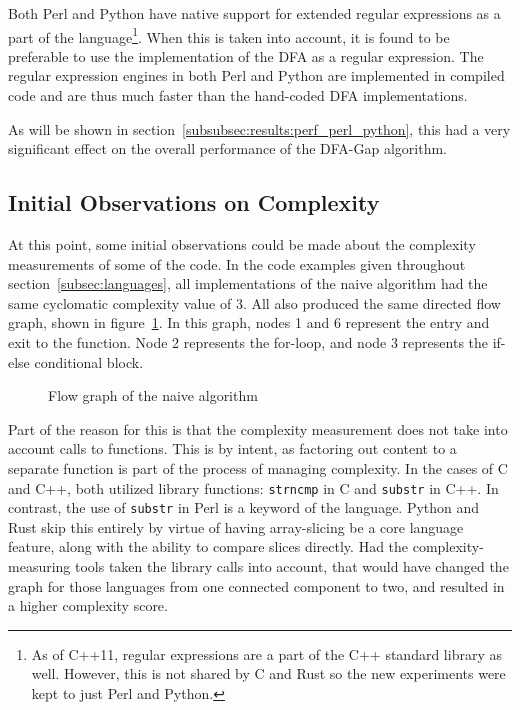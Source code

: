 Both Perl and Python have native support for extended regular expressions as a part of the language\footnote{As of C++11, regular expressions are a part of the C++ standard library as well. However, this is not shared by C and Rust so the new experiments were kept to just Perl and Python.}. When this is taken into account, it is found to be preferable to use the implementation of the DFA as a regular expression. The regular expression engines in both Perl and Python are implemented in compiled code and are thus much faster than the hand-coded DFA implementations.

As will be shown in section~\ref{subsubsec:results:perf_perl_python}, this had a very significant effect on the overall performance of the DFA-Gap algorithm.

\subsection{Initial Observations on Complexity}

At this point, some initial observations could be made about the complexity measurements of some of the code. In the code examples given throughout section~\ref{subsec:languages}, all implementations of the naive algorithm had the same cyclomatic complexity value of 3. All also produced the same directed flow graph, shown in figure~\ref{fig:graph-naive}. In this graph, nodes 1 and 6 represent the entry and exit to the function. Node 2 represents the for-loop, and node 3 represents the if-else conditional block.

\begin{figure}[ht]
\centering

\caption{Flow graph of the naive algorithm}
\label{fig:graph-naive}
\end{figure}

Part of the reason for this is that the complexity measurement does not take into account calls to functions. This is by intent, as factoring out content to a separate function is part of the process of managing complexity. In the cases of C and C++, both utilized library functions: \texttt{strncmp} in C and \texttt{substr} in C++. In contrast, the use of \texttt{substr} in Perl is a keyword of the language. Python and Rust skip this entirely by virtue of having array-slicing be a core language feature, along with the ability to compare slices directly. Had the complexity-measuring tools taken the library calls into account, that would have changed the graph for those languages from one connected component to two, and resulted in a higher complexity score.

